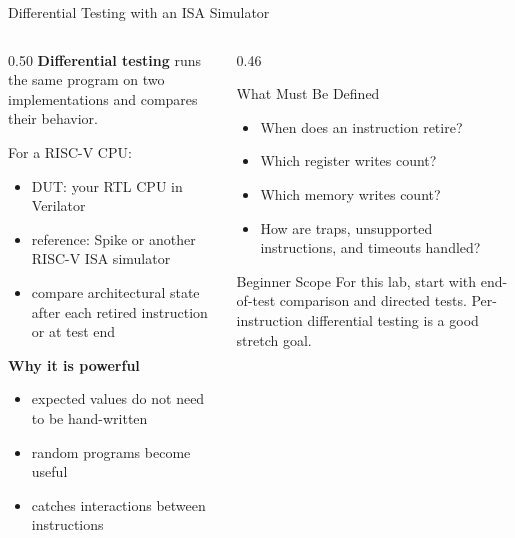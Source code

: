 \documentclass[aspectratio=169,10pt]{beamer}
\begin{document}
\begin{frame}{Differential Testing with an ISA Simulator}
  \begin{columns}[T]
    \begin{column}{0.50\textwidth}
      \textbf{Differential testing} runs the same program on two implementations and compares their behavior.

      \vspace{0.7em}
      For a RISC-V CPU:
      \begin{itemize}
        \item DUT: your RTL CPU in Verilator
        \item reference: Spike or another RISC-V ISA simulator
        \item compare architectural state after each retired instruction or at test end
      \end{itemize}

      \vspace{0.7em}
      \textbf{Why it is powerful}
      \begin{itemize}
        \item expected values do not need to be hand-written
        \item random programs become useful
        \item catches interactions between instructions
      \end{itemize}
    \end{column}
    \begin{column}{0.46\textwidth}
      \begin{block}{What Must Be Defined}
        \begin{itemize}\small
          \item When does an instruction retire?
          \item Which register writes count?
          \item Which memory writes count?
          \item How are traps, unsupported instructions, and timeouts handled?
        \end{itemize}
      \end{block}

      \vspace{0.7em}
      \begin{alertblock}{Beginner Scope}
        For this lab, start with end-of-test comparison and directed tests. Per-instruction differential testing is a good stretch goal.
      \end{alertblock}
    \end{column}
  \end{columns}
\end{frame}
\end{document}
